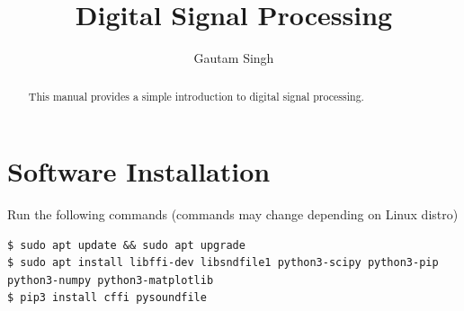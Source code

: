 \documentclass[journal,12pt,twocolumn]{IEEEtran}
\renewcommand\thesection{\arabic{section}}
\begin{document}
\def\putbox#1#2#3{\makebox[0in][l]{\makebox[#1][l]{}\raisebox{\baselineskip}[0in][0in]{\raisebox{#2}[0in][0in]{#3}}}}
     \def\rightbox#1{\makebox[0in][r]{#1}}
     \def\centbox#1{\makebox[0in]{#1}}
     \def\topbox#1{\raisebox{-\baselineskip}[0in][0in]{#1}}
     \def\midbox#1{\raisebox{-0.5\baselineskip}[0in][0in]{#1}}

\vspace{3cm}

\title{Digital Signal Processing}

\author{Gautam Singh} 

\maketitle


\tableofcontents





\bigskip

\begin{abstract}
This manual provides a simple introduction to digital signal processing.
\end{abstract}
\noindent \section{Software Installation}
\noindent Run the following commands (commands may change depending on Linux distro)
\begin{lstlisting}
$ sudo apt update && sudo apt upgrade
$ sudo apt install libffi-dev libsndfile1 python3-scipy python3-pip python3-numpy python3-matplotlib 
$ pip3 install cffi pysoundfile 
\end{lstlisting}
\end{document}
